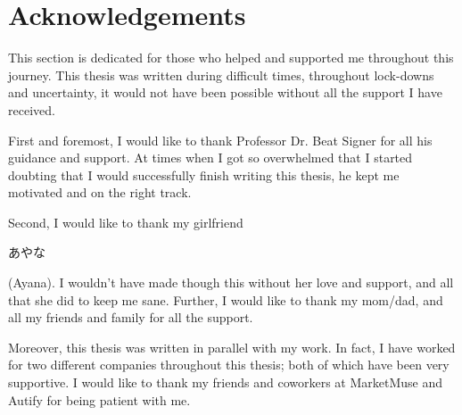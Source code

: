 \section*{Acknowledgements} \label{acknowledgements}

This section is dedicated for those who helped and supported me throughout this journey. This thesis was written during difficult times, throughout lock-downs and uncertainty, it would not have been possible without all the support I have received.

First and foremost, I would like to thank Professor Dr. Beat Signer for all his guidance and support. At times when I got so overwhelmed that I started doubting that I would successfully finish writing this thesis, he kept me motivated and on the right track.

Second, I would like to thank my girlfriend \begin{CJK}{UTF8}{min}あやな\end{CJK} (Ayana). I wouldn't have made though this without her love and support, and all that she did to keep me sane. Further, I would like to thank my mom/dad, and all my friends and family for all the support.

Moreover, this thesis was written in parallel with my work. In fact, I have worked for two different companies throughout this thesis; both of which have been very supportive. I would like to thank my friends and coworkers at MarketMuse and Autify for being patient with me.